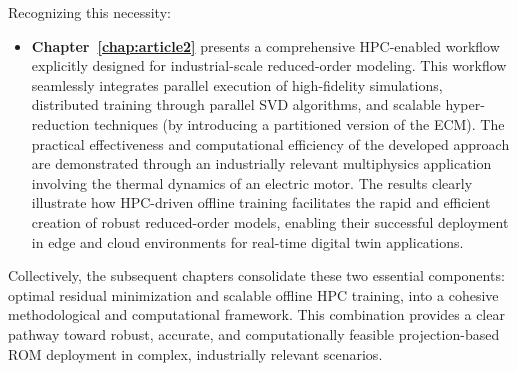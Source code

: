 Recognizing this necessity:
\begin{itemize}
    \item \textbf{Chapter~\ref{chap:article2}} presents a comprehensive HPC-enabled workflow explicitly designed for industrial-scale reduced-order modeling. This workflow seamlessly integrates parallel execution of high-fidelity simulations, distributed training through parallel SVD algorithms, and scalable hyper-reduction techniques (by introducing a partitioned version of the ECM). The practical effectiveness and computational efficiency of the developed approach are demonstrated through an industrially relevant multiphysics application involving the thermal dynamics of an electric motor. The results clearly illustrate how HPC-driven offline training facilitates the rapid and efficient creation of robust reduced-order models, enabling their successful deployment in edge and cloud environments for real-time digital twin applications.
\end{itemize}

Collectively, the subsequent chapters consolidate these two essential components: optimal residual minimization and scalable offline HPC training, into a cohesive methodological and computational framework. This combination provides a clear pathway toward robust, accurate, and computationally feasible projection-based ROM deployment in complex, industrially relevant scenarios.



